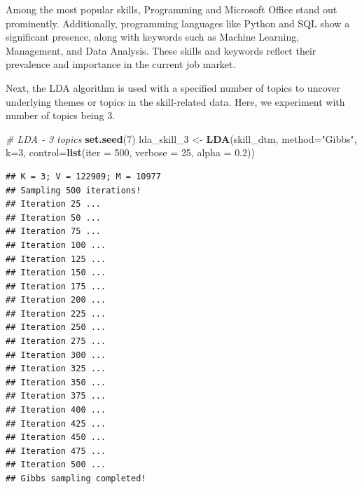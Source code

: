 \documentclass[11pt,]{article}
\newenvironment{Shaded}{\begin{snugshade}}{\end{snugshade}}
\newcommand{\AttributeTok}[1]{\textcolor[rgb]{0.13,0.29,0.53}{#1}}
\newcommand{\CommentTok}[1]{\textcolor[rgb]{0.56,0.35,0.01}{\textit{#1}}}
\newcommand{\DecValTok}[1]{\textcolor[rgb]{0.00,0.00,0.81}{#1}}
\newcommand{\FloatTok}[1]{\textcolor[rgb]{0.00,0.00,0.81}{#1}}
\newcommand{\FunctionTok}[1]{\textcolor[rgb]{0.13,0.29,0.53}{\textbf{#1}}}
\newcommand{\NormalTok}[1]{#1}
\newcommand{\OtherTok}[1]{\textcolor[rgb]{0.56,0.35,0.01}{#1}}
\newcommand{\StringTok}[1]{\textcolor[rgb]{0.31,0.60,0.02}{#1}}
\begin{document}
Among the most popular skills, Programming and Microsoft Office stand
out prominently. Additionally, programming languages like Python and SQL
show a significant presence, along with keywords such as Machine
Learning, Management, and Data Analysis. These skills and keywords
reflect their prevalence and importance in the current job market.

Next, the LDA algorithm is used with a specified number of topics to
uncover underlying themes or topics in the skill-related data. Here, we
experiment with number of topics being 3.

\begin{Shaded}
\begin{Highlighting}[]
\CommentTok{\# LDA {-} 3 topics}
\FunctionTok{set.seed}\NormalTok{(}\DecValTok{7}\NormalTok{)}
\NormalTok{lda\_skill\_3 }\OtherTok{\textless{}{-}} \FunctionTok{LDA}\NormalTok{(skill\_dtm, }\AttributeTok{method=}\StringTok{"Gibbs"}\NormalTok{, }\AttributeTok{k=}\DecValTok{3}\NormalTok{, }
                   \AttributeTok{control=}\FunctionTok{list}\NormalTok{(}\AttributeTok{iter =} \DecValTok{500}\NormalTok{, }\AttributeTok{verbose =} \DecValTok{25}\NormalTok{, }\AttributeTok{alpha =} \FloatTok{0.2}\NormalTok{))}
\end{Highlighting}
\end{Shaded}

\begin{verbatim}
## K = 3; V = 122909; M = 10977
## Sampling 500 iterations!
## Iteration 25 ...
## Iteration 50 ...
## Iteration 75 ...
## Iteration 100 ...
## Iteration 125 ...
## Iteration 150 ...
## Iteration 175 ...
## Iteration 200 ...
## Iteration 225 ...
## Iteration 250 ...
## Iteration 275 ...
## Iteration 300 ...
## Iteration 325 ...
## Iteration 350 ...
## Iteration 375 ...
## Iteration 400 ...
## Iteration 425 ...
## Iteration 450 ...
## Iteration 475 ...
## Iteration 500 ...
## Gibbs sampling completed!
\end{verbatim}
\end{document}
